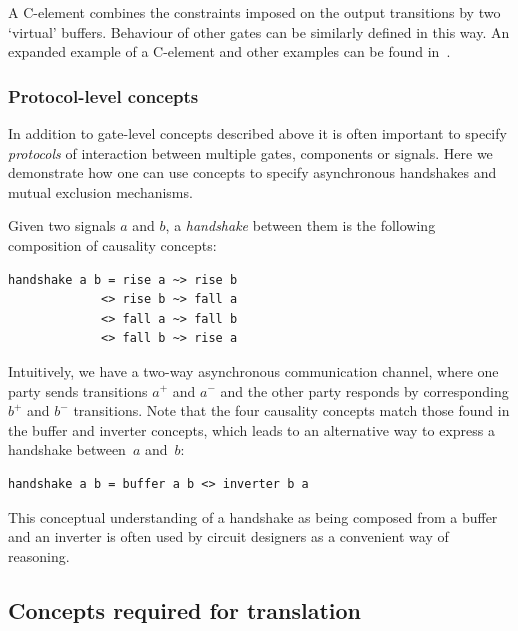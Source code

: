 \documentclass[british,conference,compsoc]{IEEEtran}
\begin{document}
A C-element combines the constraints imposed on the output
transitions by two `virtual' buffers. Behaviour of other gates can be similarly
defined in this way. An expanded example of a C-element and other examples can 
be found in~\cite{2015_Beaumont_MEMOCODE}.

\vspace{-2mm}

\subsubsection{Protocol-level concepts} In addition to gate-level concepts
described above it is often important to specify \emph{protocols}
of interaction between multiple gates, components or signals. Here we 
demonstrate how one can use concepts to specify asynchronous handshakes
and mutual exclusion mechanisms.

Given two signals $a$ and $b$, a \emph{handshake} between them is
the following composition of causality concepts:

\begin{verbatim}
handshake a b = rise a ~> rise b 
             <> rise b ~> fall a 
             <> fall a ~> fall b 
             <> fall b ~> rise a
\end{verbatim}

Intuitively, we have a two-way asynchronous communication channel,
where one party sends transitions $a^{+}$ and $a^{-}$ and the other
party responds by corresponding $b^{+}$ and $b^{-}$ transitions.
Note that the four causality concepts match those found
in the buffer and inverter concepts, which leads to an alternative
way to express a handshake between~$a$ and~$b$:

\begin{verbatim}
handshake a b = buffer a b <> inverter b a
\end{verbatim}

This conceptual understanding of a handshake as being composed
from a buffer and an inverter is often used by circuit designers as
a convenient way of reasoning.

\vspace{-2mm}

\subsection{Concepts required for translation\label{sub:trans-concepts}}

\vspace{-2mm}
\end{document}
